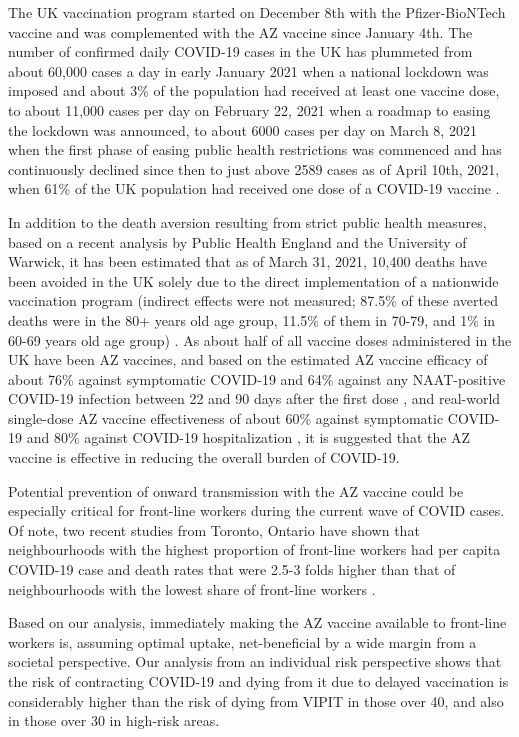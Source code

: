 \documentclass[]{interact}
\theoremstyle{plain}%
\theoremstyle{definition}
\theoremstyle{remark}
\begin{document}
The UK vaccination program started on December 8th with the
Pfizer-BioNTech vaccine and was complemented with the AZ vaccine since
January 4th. The number of confirmed daily COVID-19 cases in the UK has
plummeted from about 60,000 cases a day in early January 2021 when a
national lockdown was imposed and about 3\% of the population had
received at least one vaccine dose, to about 11,000 cases per day on
February 22, 2021 when a roadmap to easing the lockdown was announced,
to about 6000 cases per day on March 8, 2021 when the first phase of
easing public health restrictions was commenced
\citep{bbc_lockdown_2021} and has continuously declined since then to
just above 2589 cases as of April 10th, 2021, when 61\% of the UK
population had received one dose of a COVID-19 vaccine
\citep{govuk_official_2021}.

In addition to the death aversion resulting from strict public health
measures, based on a recent analysis by Public Health England and the
University of Warwick, it has been estimated that as of March 31, 2021,
10,400 deaths have been avoided in the UK solely due to the direct
implementation of a nationwide vaccination program (indirect effects
were not measured; 87.5\% of these averted deaths were in the 80+ years
old age group, 11.5\% of them in 70-79, and 1\% in 60-69 years old age
group) \citep{public_health_england_impact_2021}. As about half of all
vaccine doses administered in the UK have been AZ vaccines, and based on
the estimated AZ vaccine efficacy of about 76\% against symptomatic
COVID-19 and 64\% against any NAAT-positive COVID-19 infection between
22 and 90 days after the first dose \citep{voysey_single-dose_2021}, and
real-world single-dose AZ vaccine effectiveness of about 60\% against
symptomatic COVID-19 and 80\% against COVID-19 hospitalization
\citep{public_health_england_1public_2021}, it is suggested that the AZ
vaccine is effective in reducing the overall burden of COVID-19.

Potential prevention of onward transmission with the AZ vaccine could be
especially critical for front-line workers during the current wave of
COVID cases. Of note, two recent studies from Toronto, Ontario have
shown that neighbourhoods with the highest proportion of front-line
workers had per capita COVID-19 case and death rates that were 2.5-3
folds higher than that of neighbourhoods with the lowest share of
front-line workers
\citep[\citet{rao_disproportionate_2021}]{chagla_characterizing_2021}.

Based on our analysis, immediately making the AZ vaccine available to
front-line workers is, assuming optimal uptake, net-beneficial by a wide
margin from a societal perspective. Our analysis from an individual risk
perspective shows that the risk of contracting COVID-19 and dying from
it due to delayed vaccination is considerably higher than the risk of
dying from VIPIT in those over 40, and also in those over 30 in
high-risk areas.
\end{document}
